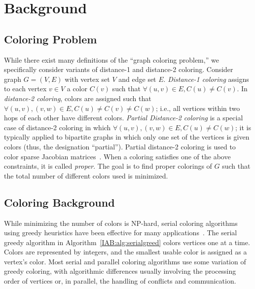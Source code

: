 \section{Background}

\subsection{Coloring Problem }

While there exist many definitions of the ``graph coloring problem,'' we specifically consider variants of distance-1 and distance-2 coloring.
Consider graph $G = (V,E)$ with vertex set $V$ and edge set $E$.
\emph{Distance-1 coloring} assigns to each vertex $v \in V$ a color $C(v)$ such that $\forall (u,v) \in E, C(u) \neq C(v)$.
In \emph{distance-2 coloring}, colors are assigned such that 
$\forall (u,v),(v,w) \in E, C(u) \neq C(v) \neq C(w)$; 
i.e., all vertices within two hops of each other have different colors.
\emph{Partial Distance-2 coloring} is a special case of distance-2 coloring in which
$\forall (u,v),(v,w) \in E, C(u) \neq C(w)$; it is typically applied to bipartite graphs
in which only one set of the vertices is given colors (thus, the designation ``partial'').
Partial distance-2 coloring is used to color sparse Jacobian matrices~\cite{GebremedhinMannePothen}.
When a coloring satisfies one of the above constraints, it is called \emph{proper}.
The goal is to find proper colorings of $G$ such that the total number of different colors used is minimized.








\subsection{Coloring Background}

While minimizing the number of colors is NP-hard, serial coloring algorithms using greedy heuristics have been effective for many applications~\cite{IAB:gebremedhin2000scalable}.
The serial greedy algorithm in Algorithm~\ref{IAB:alg:serialgreed} colors vertices one at a time.
Colors are represented by integers, and the smallest usable color is assigned as a vertex's color.
Most serial and parallel coloring algorithms use some variation of greedy coloring, with algorithmic differences usually involving the processing order of vertices or, in parallel, the handling of conflicts and communication.

